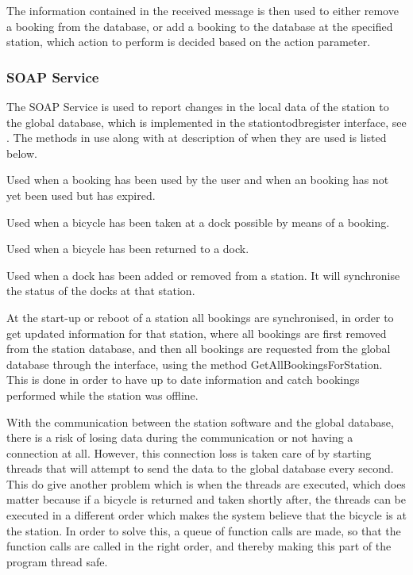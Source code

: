 The information contained in the received message is then used to either remove a booking from the database, or add a booking to the database at the specified station, which action to perform is decided based on the action parameter.

\subsubsection{SOAP Service}
The SOAP Service is used to report changes in the local data of the station to the global database, which is implemented in the stationtodbregister interface, see .
The methods in use along with at description of when they are used is listed below.

\begin{description}[style=nextline]
\item[BicycleWithBookingUnlocked] Used when a booking has been used by the user and when an booking has not yet been used but has expired.
\item[BicycleTaken] Used when a bicycle has been taken at a dock possible by means of a booking.
\item[BicycleReturnedToDockAtStation] Used when a bicycle has been returned to a dock.
\item[SyncDockStatus] Used when a dock has been added or removed from a station. It will synchronise the status of the docks at that station.
\end{description}

At the start-up or reboot of a station all bookings are synchronised, in order to get updated information for that station, where all bookings are first removed from the station database, and then all bookings are requested from the global database through the interface, using the method GetAllBookingsForStation.
This is done in order to have up to date information and catch bookings performed while the station was offline.

With the communication between the station software and the global database, there is a risk of losing data during the communication or not having a connection at all.
However, this connection loss is taken care of by starting threads that will attempt to send the data to the global database every second.
This do give another problem which is when the threads are executed, which does matter because if a bicycle is returned and taken shortly after, the threads can be executed in a different order which makes the system believe that the bicycle is at the station. 
In order to solve this, a queue of function calls are made, so that the function calls are called in the right order, and thereby making this part of the program thread safe.

